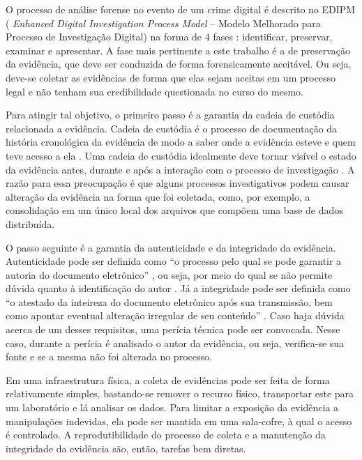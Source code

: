 O processo de análise forense no evento de um crime digital é descrito no EDIPM ( \textit{Enhanced Digital Investigation Process Model} -- Modelo Melhorado para Processo de Investigação Digital) na forma de 4 fases \cite{GrisposChallengesCloudComputing:2012}: identificar, preservar, examinar e apresentar.
%
A fase mais pertinente a este trabalho é a de preservação da evidência, que deve ser conduzida de forma forensicamente aceitável.
%
Ou seja, deve-se coletar as evidências de forma que elas sejam aceitas em um processo legal e não tenham sua credibilidade questionada no curso do mesmo.


Para atingir tal objetivo, o primeiro passo é a garantia da cadeia de custódia relacionada a evidência.
%
Cadeia de custódia é o processo de documentação da história cronológica da evidência de modo a saber onde a evidência esteve e quem teve acesso a ela \cite{Ramos:2011}. 
%
Uma cadeia de custódia idealmente deve tornar visível o estado da evidência antes, durante e após a interação com o processo de investigação \cite{LuisDigitalChainOfCustody:2016}.
%
A razão para essa preocupação é que alguns processos investigativos podem causar alteração da evidência na forma que foi coletada, como, por exemplo, a consolidação em um único local dos arquivos que compõem uma base de dados distribuída.


O passo seguinte é a garantia da autenticidade e da integridade da evidência.
%
Autenticidade pode ser definida como ``o processo pelo qual se pode garantir a autoria do documento eletrônico'' \cite{Ramos:2011}, ou seja, por meio do qual se não permite dúvida quanto à identificação do autor .
%
Já a integridade pode ser definida como ``o atestado da inteireza do documento eletrônico após sua transmissão, bem como apontar eventual alteração irregular de seu conteúdo'' \cite{Ramos:2011}. 
%
Caso haja dúvida acerca de um desses requisitos, uma perícia técnica pode ser convocada.
%
Nesse caso, durante a perícia é analisado o autor da evidência, ou seja, verifica-se sua fonte e se a mesma não foi alterada no processo.


Em uma infraestrutura física, a coleta de evidências pode ser feita de forma relativamente simples, bastando-se remover o recurso físico, transportar este para um laboratório e lá analisar os dados. 
%
Para limitar a exposição da evidência a manipulações indevidas, ela pode ser mantida em uma sala-cofre, à qual o acesso é controlado.
%
A reprodutibilidade do processo de coleta e a manutenção da integridade da evidência são, então, tarefas bem diretas.


